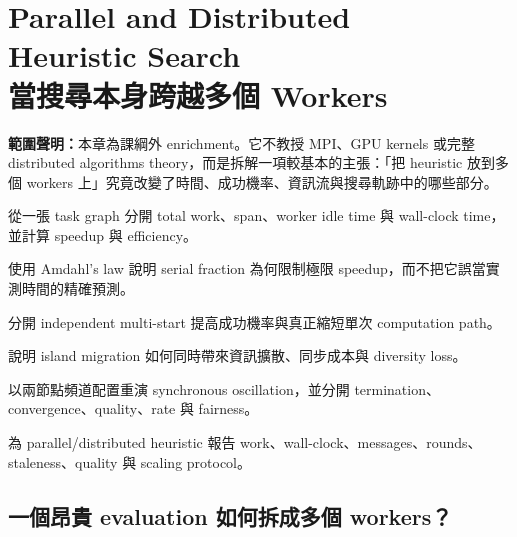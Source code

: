 \documentclass[11pt,a4paper,oneside,openany]{book}
\begin{document}
\chapter[Parallel and Distributed Heuristic Search：跨 Workers 的搜尋]
{Parallel and Distributed\\Heuristic Search\\當搜尋本身跨越多個 Workers}
\label{app:parallel-search}
\noindent\textbf{範圍聲明：}本章為課綱外 enrichment。它不教授 MPI、GPU kernels 或完整 distributed algorithms theory，而是拆解一項較基本的主張：「把 heuristic 放到多個 workers 上」究竟改變了時間、成功機率、資訊流與搜尋軌跡中的哪些部分。
\begin{chaptermastery}
\item 從一張 task graph 分開 total work、span、worker idle time 與 wall-clock time，並計算 speedup 與 efficiency。
\item 使用 Amdahl's law 說明 serial fraction 為何限制極限 speedup，而不把它誤當實測時間的精確預測。
\item 分開 independent multi-start 提高成功機率與真正縮短單次 computation path。
\item 說明 island migration 如何同時帶來資訊擴散、同步成本與 diversity loss。
\item 以兩節點頻道配置重演 synchronous oscillation，並分開 termination、convergence、quality、rate 與 fairness。
\item 為 parallel/distributed heuristic 報告 work、wall-clock、messages、rounds、staleness、quality 與 scaling protocol。
\end{chaptermastery}

\section{一個昂貴 evaluation 如何拆成多個 workers？}
\end{document}
